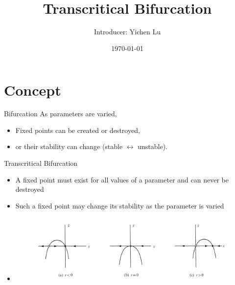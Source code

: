 \documentclass[10pt,aspectratio=43,mathserif,table]{beamer}
\title{Transcritical Bifurcation}
\author{Introducer: Yichen Lu\quad \newline  \newline \quad }
\institute{\fontsize{8pt}{14pt}}
\date{\today}
\begin{document}

\frame{\titlepage}


\section{Concept}

\begin{frame}{Bifurcation}
As parameters are varied,
  \begin{itemize}
    \item Fixed points can be created or destroyed,
    \item or their stability can change (stable $\leftrightarrow$ unstable). 
  \end{itemize}
\end{frame}

\begin{frame}{Transcritical Bifurcation}
  \begin{itemize}
    \item A fixed point must exist for all values of a parameter and can never be destroyed
    \item Such a fixed point may change its stability as the parameter is varied
    \item 
	\begin{figure}
      \centering
      \includegraphics[width=\textwidth]{fig1.png}
    \end{figure}
  \end{itemize}
\end{frame}
\end{document}
